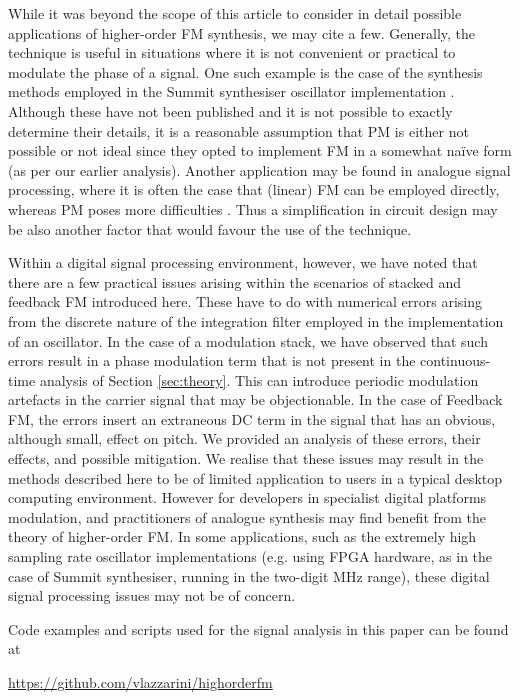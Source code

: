 \documentclass[]{interact}
\begin{document}
While it was beyond the scope of this article to consider in detail possible applications of higher-order FM synthesis, we may cite a few. Generally, the technique is useful in situations where it is not convenient or practical to modulate the phase of a signal. One such example is the case of the synthesis methods employed in the Summit synthesiser oscillator implementation \citep{Summit}. Although these have not been published and it is not possible to exactly determine their details, it is a reasonable assumption that PM is either not possible or not ideal since they opted to implement FM in a somewhat na\"{i}ve form (as per our earlier analysis). Another application may be found in analogue signal processing, where it is often the case that (linear) FM can be employed directly, whereas PM poses more difficulties \citep{LazzariniTimoney2021}. Thus a simplification in circuit design may be also another factor that would favour the use of the technique.

Within a digital signal processing environment, however, we have noted that there are a few practical issues arising within
the scenarios of stacked and feedback FM introduced here. These have to do with numerical errors arising 
from the discrete nature of the integration filter employed in the implementation of an oscillator. In the case of a modulation stack, we have observed that such errors result in a phase modulation term that is not present in the
continuous-time analysis of Section \ref{sec:theory}. This can introduce periodic modulation artefacts in the carrier signal that may be objectionable. In the case of Feedback FM, the errors insert an extraneous DC term in the signal that has an obvious, although small, effect on pitch. We provided an analysis of these errors, their effects, and possible mitigation. We realise that these issues may 
result in the methods described here to be of limited application to users in a typical 
desktop computing environment. However for developers in specialist digital platforms
modulation, and practitioners of analogue synthesis may find benefit from the theory of higher-order FM.
In some applications, such as the extremely high sampling rate oscillator implementations (e.g. using FPGA hardware, as in the case of Summit synthesiser, running in the two-digit MHz range), these digital
signal processing issues may not be of concern.

Code examples and scripts used for the signal analysis in this paper can be found at\\

\begin{center}
\url{https://github.com/vlazzarini/highorderfm}
\end{center}



\end{document}
